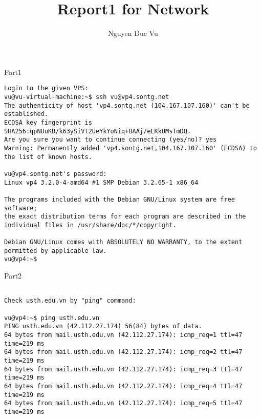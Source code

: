 \documentclass{report}
\title{Report1 for Network}
\author{Nguyen Duc Vu}
\begin{document}
\maketitle

\begin{section}{Part1}

\begin{verbatim}
Login to the given VPS:
vu@vu-virtual-machine:~$ ssh vu@vp4.sontg.net
The authenticity of host 'vp4.sontg.net (104.167.107.160)' can't be established.
ECDSA key fingerprint is SHA256:qpNUuKD/k63ySiVt2UeYkYoNiq+BAAj/eLKkUMsTmDQ.
Are you sure you want to continue connecting (yes/no)? yes
Warning: Permanently added 'vp4.sontg.net,104.167.107.160' (ECDSA) to the list of known hosts.

vu@vp4.sontg.net's password: 
Linux vp4 3.2.0-4-amd64 #1 SMP Debian 3.2.65-1 x86_64

The programs included with the Debian GNU/Linux system are free software;
the exact distribution terms for each program are described in the
individual files in /usr/share/doc/*/copyright.

Debian GNU/Linux comes with ABSOLUTELY NO WARRANTY, to the extent
permitted by applicable law.
vu@vp4:~$ 
\end{verbatim}

\end{section}


\begin{section}{Part2}

\begin{verbatim}

Check usth.edu.vn by "ping" command:

vu@vp4:~$ ping usth.edu.vn
PING usth.edu.vn (42.112.27.174) 56(84) bytes of data.
64 bytes from mail.usth.edu.vn (42.112.27.174): icmp_req=1 ttl=47 time=219 ms
64 bytes from mail.usth.edu.vn (42.112.27.174): icmp_req=2 ttl=47 time=219 ms
64 bytes from mail.usth.edu.vn (42.112.27.174): icmp_req=3 ttl=47 time=219 ms
64 bytes from mail.usth.edu.vn (42.112.27.174): icmp_req=4 ttl=47 time=219 ms
64 bytes from mail.usth.edu.vn (42.112.27.174): icmp_req=5 ttl=47 time=219 ms
\end{verbatim}

\end{section}
\end{document}

